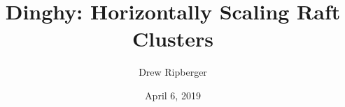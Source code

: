 \documentclass[11pt, twocolumn]{article}
\title{Dinghy: Horizontally Scaling Raft Clusters}
\author{Drew Ripberger}
\date{April 6, 2019}
\begin{document}
  \maketitle
  \textbf{}
  
  
  
  
  
  
  
  
  
\end{document}
